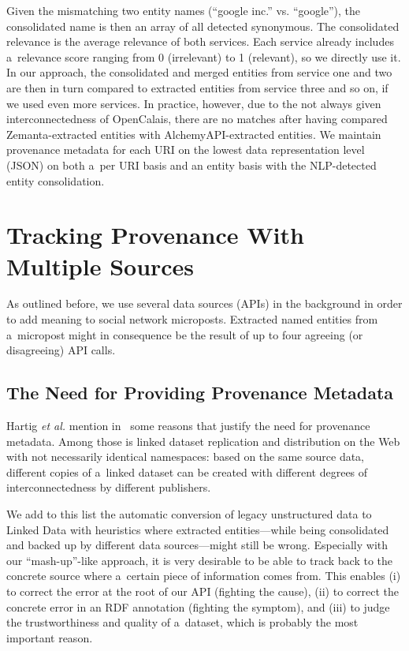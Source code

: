 Given the mismatching two entity names (``google inc.'' vs. ``google''), the consolidated name is then an array of all
detected synonymous. The consolidated relevance is the average relevance of both services. Each service already includes a~relevance score ranging from
0 (irrelevant) to 1 (relevant), so we directly use it. In our approach, the consolidated and merged entities from
service one and two are then in turn compared to extracted entities from service three and so on, if we used even more
services. In practice, however, due to the not always given interconnectedness of OpenCalais, there are no matches
after having compared Zemanta-extracted entities with AlchemyAPI-extracted entities. We maintain provenance metadata for each URI on the lowest data representation level (JSON)
on both a~per URI basis and an entity basis with the NLP-detected entity consolidation.

\section{Tracking Provenance With Multiple Sources}                    \label{sec:tracking}
As outlined before, we use several data sources (APIs) in the background in order to add meaning to social network microposts. Extracted named entities from a~micropost might in consequence be the result of up to four agreeing (or disagreeing) API calls. 

\subsection{The Need for Providing Provenance Metadata}
Hartig \emph{et al.} mention in~\cite{ipaw10:olaf} some reasons that justify the need for provenance metadata. Among those is linked dataset replication and distribution on the Web with not necessarily identical namespaces: based on the same source data, different copies of a~linked dataset can be created with different degrees of interconnectedness by different publishers.

We add to this list the automatic conversion of legacy unstructured data to Linked Data with heuristics where extracted entities---while being consolidated and backed up by different data sources---might still be wrong. Especially with our ``mash-up''-like approach, it is very desirable to be able to track back to the concrete source where a~certain piece of information comes from. This enables (i) to correct the error at the root of our API (fighting the cause), (ii) to correct the concrete error in an RDF annotation (fighting the symptom), and (iii) to judge the trustworthiness and quality of a~dataset, which is probably the most important reason.

